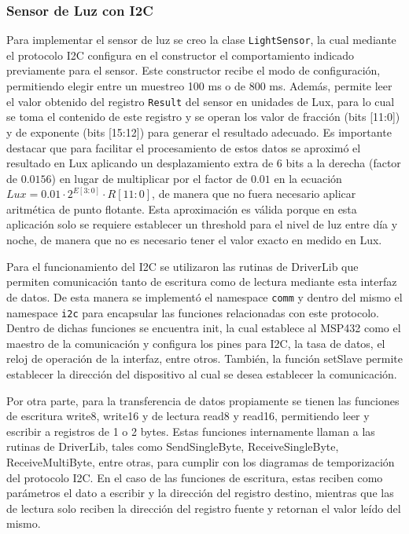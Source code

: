 \subsubsection{Sensor de Luz con I2C}
Para implementar el sensor de luz se creo la clase \texttt{LightSensor}, la cual mediante el
protocolo I2C configura en el constructor el comportamiento indicado previamente para el
sensor. Este constructor recibe el modo de configuración, permitiendo elegir entre un muestreo 100
ms o de 800 ms. Además, permite leer el valor obtenido del registro \texttt{Result} del sensor en
unidades de Lux, para lo cual se toma el contenido de este registro y se operan los valor de
fracción (bits [11:0]) y de exponente (bits [15:12]) para generar el resultado adecuado. Es
importante destacar que para facilitar el procesamiento de estos datos se aproximó el resultado en
Lux aplicando un desplazamiento extra de 6 bits a la derecha (factor de $0.0156$) en lugar de
multiplicar por el factor de $0.01$ en la ecuación $Lux = 0.01 \cdot 2^{E[3:0]} \cdot R[11:0]$, de
manera que no fuera necesario aplicar aritmética de punto flotante. Esta aproximación es válida
porque en esta aplicación solo se requiere establecer un threshold para el nivel de luz entre día y
noche, de manera que no es necesario tener el valor exacto en medido en Lux.

Para el funcionamiento del I2C se utilizaron las rutinas de DriverLib que permiten comunicación
tanto de escritura como de lectura mediante esta interfaz de datos. De esta manera se implementó el
namespace \texttt{comm} y dentro del mismo el namespace \texttt{i2c} para encapsular las funciones
relacionadas con este protocolo. Dentro de dichas funciones se encuentra init, la cual establece al
MSP432 como el maestro de la comunicación y configura los pines para I2C, la tasa de datos, el reloj
de operación de la interfaz, entre otros. También, la función setSlave permite establecer la
dirección del dispositivo al cual se desea establecer la comunicación. 

Por otra parte, para la transferencia de datos propiamente se tienen las funciones de escritura
write8, write16 y de lectura read8 y read16, permitiendo leer y escribir a registros de 1 o 2
bytes. Estas funciones internamente llaman a las rutinas de DriverLib, tales como SendSingleByte,
ReceiveSingleByte, ReceiveMultiByte, entre otras, para cumplir con los diagramas de temporización
del protocolo I2C. En el caso de las funciones de escritura, estas reciben como parámetros el dato a
escribir y la dirección del registro destino, mientras que las de lectura solo reciben la dirección
del registro fuente y retornan el valor leído del mismo.


